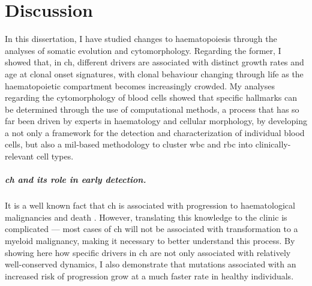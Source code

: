 \chapter{Discussion}

In this dissertation, I have studied changes to haematopoiesis through the analyses of somatic evolution and cytomorphology. Regarding the former, I showed that, in \ac{ch}, different drivers are associated with distinct growth rates and age at clonal onset signatures, with clonal behaviour changing through life as the haematopoietic compartment becomes increasingly crowded. My analyses regarding the cytomorphology of blood cells showed that specific hallmarks can be determined through the use of computational methods, a process that has so far been driven by experts in haematology and cellular morphology, by developing a not only a framework for the detection and characterization of individual blood cells, but also a \ac{mil}-based methodology to cluster \ac{wbc} and \ac{rbc} into clinically-relevant cell types. 

\paragraph{\Ac{ch} and its role in early detection.} It is a well known fact that \ac{ch} is associated with progression to haematological malignancies and death \cite{Genovese2014-eu,Jaiswal2014-rl,Abelson2018-wh}. However, translating this knowledge to the clinic is complicated --- most cases of \ac{ch} will not be associated with transformation to a myeloid malignancy, making it necessary to better understand this process. By showing here how specific drivers in \ac{ch} are not only associated with relatively well-conserved dynamics, I also demonstrate that mutations associated with an increased risk of progression grow at a much faster rate in healthy individuals. 

